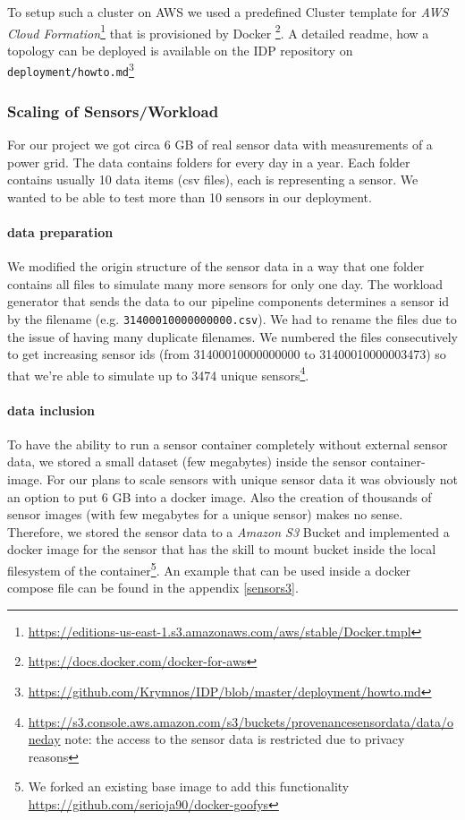 To setup such a cluster on AWS we used a predefined Cluster template for \emph{AWS Cloud Formation}\footnote{\url{https://editions-us-east-1.s3.amazonaws.com/aws/stable/Docker.tmpl}} that is provisioned by Docker \footnote{\url{https://docs.docker.com/docker-for-aws}}. A detailed readme, how a topology can be deployed is available on the IDP repository on \texttt{deployment/howto.md}\footnote{\url{https://github.com/Krymnos/IDP/blob/master/deployment/howto.md}}

\subsubsection*{Scaling of Sensors/Workload}
For our project we got circa 6 GB of real sensor data with measurements of a power grid. The data contains folders for every day in a year. Each folder contains usually 10 data items (csv files), each is representing a sensor. We wanted to be able to test more than 10 sensors in our deployment.

\paragraph*{data preparation}
We modified the origin structure of the sensor data in a way that one folder contains all files to simulate many more sensors for only one day.
The workload generator that sends the data to our pipeline components determines a sensor id by the filename (e.g. \texttt{31400010000000000.csv}). We had to rename the files due to the issue of having many duplicate filenames. We numbered the files consecutively to get increasing sensor ids (from 31400010000000000 to 31400010000003473) so that we're able to simulate up to 3474 unique sensors\footnote{\url{https://s3.console.aws.amazon.com/s3/buckets/provenancesensordata/data/oneday} note: the access to the sensor data is restricted due to privacy reasons}.

\paragraph*{data inclusion}
To have the ability to run a sensor container completely without external sensor data, we stored a small dataset (few megabytes) inside the sensor container-image.
For our plans to scale sensors with unique sensor data it was obviously not an option to put 6 GB into a docker image. Also the creation of thousands of sensor images (with few megabytes for a unique sensor) makes no sense.
Therefore, we stored the sensor data to a \emph{Amazon S3} Bucket and implemented a docker image for the sensor that has the skill to mount bucket inside the local filesystem of the container\footnote{We forked an existing base image to add this functionality \url{https://github.com/serioja90/docker-goofys}}. An example that can be used inside a docker compose file can be found in the appendix \ref{sensors3}.

